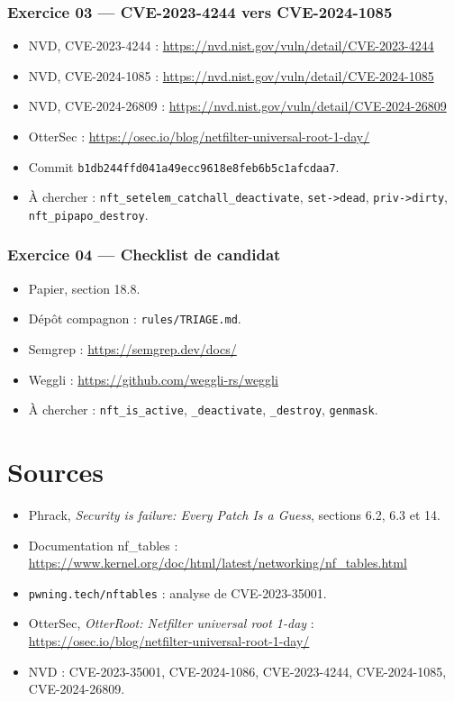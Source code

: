 \documentclass{training}
\begin{document}
\subsection*{Exercice 03 --- CVE-2023-4244 vers CVE-2024-1085}
\begin{itemize}
  \item NVD, CVE-2023-4244 :
        \url{https://nvd.nist.gov/vuln/detail/CVE-2023-4244}
  \item NVD, CVE-2024-1085 :
        \url{https://nvd.nist.gov/vuln/detail/CVE-2024-1085}
  \item NVD, CVE-2024-26809 :
        \url{https://nvd.nist.gov/vuln/detail/CVE-2024-26809}
  \item OtterSec :
        \url{https://osec.io/blog/netfilter-universal-root-1-day/}
  \item Commit \texttt{b1db244ffd041a49ecc9618e8feb6b5c1afcdaa7}.
  \item À chercher : \texttt{nft\_setelem\_catchall\_deactivate},
        \texttt{set->dead}, \texttt{priv->dirty}, \texttt{nft\_pipapo\_destroy}.
\end{itemize}

\subsection*{Exercice 04 --- Checklist de candidat}
\begin{itemize}
  \item Papier, section 18.8.
  \item Dépôt compagnon : \texttt{rules/TRIAGE.md}.
  \item Semgrep : \url{https://semgrep.dev/docs/}
  \item Weggli : \url{https://github.com/weggli-rs/weggli}
  \item À chercher : \texttt{nft\_is\_active}, \texttt{\_deactivate},
        \texttt{\_destroy}, \texttt{genmask}.
\end{itemize}

\chapter{Sources}
\begin{itemize}
  \item Phrack, \emph{Security is failure: Every Patch Is a Guess},
        sections 6.2, 6.3 et 14.
  \item Documentation nf\_tables :
        \url{https://www.kernel.org/doc/html/latest/networking/nf_tables.html}
  \item \texttt{pwning.tech/nftables} : analyse de CVE-2023-35001.
  \item OtterSec, \emph{OtterRoot: Netfilter universal root 1-day} :
        \url{https://osec.io/blog/netfilter-universal-root-1-day/}
  \item NVD : CVE-2023-35001, CVE-2024-1086, CVE-2023-4244,
        CVE-2024-1085, CVE-2024-26809.
\end{itemize}

\end{document}
